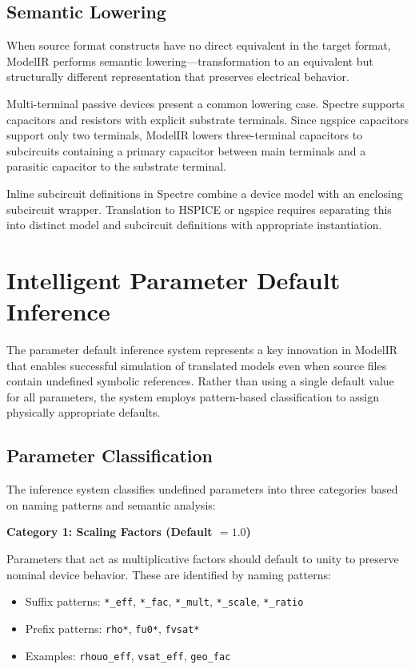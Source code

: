 \documentclass[conference]{IEEEtran}
\begin{document}
\subsection{Semantic Lowering}

When source format constructs have no direct equivalent in the target format, ModelIR performs semantic lowering---transformation to an equivalent but structurally different representation that preserves electrical behavior.

Multi-terminal passive devices present a common lowering case. Spectre supports capacitors and resistors with explicit substrate terminals. Since ngspice capacitors support only two terminals, ModelIR lowers three-terminal capacitors to subcircuits containing a primary capacitor between main terminals and a parasitic capacitor to the substrate terminal.

Inline subcircuit definitions in Spectre combine a device model with an enclosing subcircuit wrapper. Translation to HSPICE or ngspice requires separating this into distinct model and subcircuit definitions with appropriate instantiation.

\section{Intelligent Parameter Default Inference}
\label{sec:defaults}

The parameter default inference system represents a key innovation in ModelIR that enables successful simulation of translated models even when source files contain undefined symbolic references. Rather than using a single default value for all parameters, the system employs pattern-based classification to assign physically appropriate defaults.

\subsection{Parameter Classification}

The inference system classifies undefined parameters into three categories based on naming patterns and semantic analysis:

\textbf{Category 1: Scaling Factors (Default $= 1.0$)}

Parameters that act as multiplicative factors should default to unity to preserve nominal device behavior. These are identified by naming patterns:
\begin{itemize}
\item Suffix patterns: \texttt{*\_eff}, \texttt{*\_fac}, \texttt{*\_mult}, \texttt{*\_scale}, \texttt{*\_ratio}
\item Prefix patterns: \texttt{rho*}, \texttt{fu0*}, \texttt{fvsat*}
\item Examples: \texttt{rhouo\_eff}, \texttt{vsat\_eff}, \texttt{geo\_fac}
\end{itemize}
\end{document}
